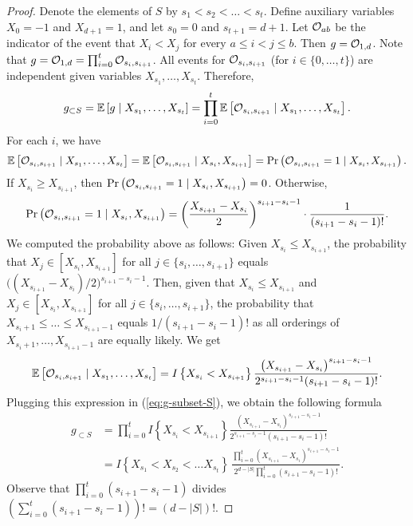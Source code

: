 \documentclass[11pt]{article}
\newcommand {\set}   [1] {\left\{ #1 \right\}}
\newcommand {\brc}   [1] {\left(#1\right)}
\newcommand {\Exp}       {\mathbb{E}}
\newcommand {\Prob}  [1] {\Pr \brc{#1 }}
\newcommand {\E}     [1] {\Exp\left[#1\right]}
\newcommand{\given}{\mid}
\newcommand {\ord}    {{\cal{O}}}
\begin{document}
\begin{proof}
Denote the elements of $S$ by $s_1 < s_2 < \dots < s_t$.
Define auxiliary variables
$X_0 = -1$ and $X_{d+1} = 1$, and let $s_0 = 0$ and $s_{t+1} = d+1$.
Let ${\cal O}_{ab}$ be the indicator of the event that
$X_i < X_j$ for every $a\leq i < j \leq b$.
Then $g = \ord_{1,d}$.  Note that
$g = \ord_{1,d} = \prod_{i=0}^{t} \ord_{s_i,s_{i+1}}$.
All events for $\ord_{s_i,s_{i+1}}$ (for $i\in \{0,\dots, t\}$)
are independent given variables $X_{s_1},\dots, X_{s_t}$. Therefore,
\begin{equation}\label{eq:g-subset-S}
g_{\subset S} = \E{g \given X_{s_1},\dots, X_{s_t}} =
\prod_{i=0}^{t} \E{\ord_{s_i,s_{i+1}} \given X_{s_1},\dots, X_{s_t}}.
\end{equation}
For each $i$, we have
$$\E{\ord_{s_i,s_{i+1}} \given X_{s_1},\dots, X_{s_t}} = \E{\ord_{s_i,s_{i+1}} \given X_{s_i}, X_{s_{i+1}}}= \Prob{\ord_{s_i,s_{i+1}} = 1\given X_{s_i}, X_{s_{i+1}}}.$$
If $X_{s_i} \geq X_{s_{i+1}}$, then $\Prob{\ord_{s_i,s_{i+1}} = 1 \given X_{s_i}, X_{s_{i+1}}}= 0$. Otherwise,
$$\Prob{\ord_{s_i,s_{i+1}} = 1 \given X_{s_i}, X_{s_{i+1}}}=
\left(\frac{X_{s_{i+1}} - X_{s_{i}}}{2}\right)^{s_{i+1} - s_{i}-1}\cdot \frac{1}{(s_{i+1} - s_{i}-1)!}.$$
We computed the probability above as follows: Given $X_{s_i}\leq X_{s_{i+1}}$, the probability that
$X_j\in [X_{s_i}, X_{s_{i+1}}]$ for all $j\in \{s_i,\dots, s_{i+1}\}$
equals $\big((X_{s_{i+1}} - X_{s_{i}})/2\big)^{s_{i+1}-s_i -1}$. Then, given that $X_{s_i}\leq X_{s_{i+1}}$
and $X_j\in [X_{s_i}, X_{s_{i+1}}]$ for all $j\in \{s_i,\dots, s_{i+1}\}$, the probability that
$X_{s_i+1}\leq \dots \leq X_{s_{i+1}-1}$ equals $1/(s_{i+1}-s_i -1)!$ as all orderings
of $X_{s_i+1}, \dots, X_{s_{i+1}-1}$ are equally likely.
We get
$$\E{\ord_{s_i,s_{i+1}} \given X_{s_1},\dots, X_{s_t}} = I\set{X_{s_i} < X_{s_{i+1}}} \frac{\left(X_{s_{i+1}} - X_{s_{i}}\right)^{s_{i+1} - s_{i}-1}}{2^{s_{i+1} - s_{i}-1} (s_{i+1} - s_{i}-1)!}.$$
Plugging this expression in (\ref{eq:g-subset-S}), we obtain the following formula
\begin{align*}
	g_{\subset S} &= \prod_{i=0}^t I\set{X_{s_i} < X_{s_{i+1}}} \frac{\left(X_{s_{i+1}} - X_{s_{i}}\right)^{s_{i+1} - s_{i}-1}}{2^{s_{i+1} - s_{i}-1} (s_{i+1} - s_{i}-1)!} \\
	&=
I\set{X_{s_1}<X_{s_2}< \dots X_{s_t}}\,
\frac{\prod_{i=0}^t \left(X_{s_{i+1}} - X_{s_{i}}\right)^{s_{i+1} - s_{i}-1}}{2^{d-|S|}
\prod_{i=0}^t (s_{i+1} - s_{i}-1)!}.
\end{align*}
Observe that $\prod_{i=0}^t (s_{i+1} - s_{i}-1)$ divides
$(\sum_{i=0}^t (s_{i+1} - s_{i}-1))! = (d - |S|)!$.

\end{proof}
\end{document}
